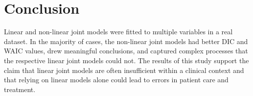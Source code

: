 \documentclass[english]{article}
\providecommand{\tabularnewline}{\\}
\theoremstyle{plain}
\begin{document}

\section{Conclusion}

Linear and non-linear joint models were fitted to multiple variables in a real dataset. In the majority of cases, the non-linear joint models had better DIC and WAIC values, drew meaningful conclusions, and captured complex processes that the respective linear joint models could not. The results of this study support the claim that linear joint models are often insufficient within a clinical context and that relying on linear models alone could lead to errors in patient care and treatment.\\
\end{document}
